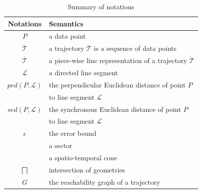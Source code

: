 \begin{table}
	\renewcommand{\arraystretch}{1.20}
	\vspace{-1ex}
	\caption{\small Summary of notations}
	\centering
	\small
	\begin{tabular}{|c|l|}
		\hline
		{\bf Notations}& {\bf Semantics}   \\		\hline %
		$P$ & a data point \\		\hline
		$\dddot{\mathcal{T}}$ & a trajectory $\dddot{\mathcal{T}}$ is a sequence of data points\\		\hline
		$\overline{\mathcal{T}}$&  {a piece-wise line representation of a trajectory $\dddot{\mathcal{T}}$}	\\		\hline
		$\mathcal{L}$ & a directed line segment  \\		\hline
		$ped(P, \mathcal{L})$ &  {the perpendicular Euclidean distance of point $P$}	\\
				& to line segment $\mathcal{L}$	\\		\hline
		$sed(P, \mathcal{L})$ & {the synchronous Euclidean distance of point $P$}	\\
				& to line segment $\mathcal{L}$	\\		\hline
		$\epsilon$ & the error bound \\		\hline
		\sector{} & a sector \\		\hline
		\cone{} & a spatio-temporal cone \\		\hline
		$\bigsqcap$ & intersection of geometries\\		\hline
		$G$ &	the reachability graph of a trajectory\\		\hline
	\end{tabular}
	\label{tab:notations}
	\vspace{-1ex}
\end{table}


